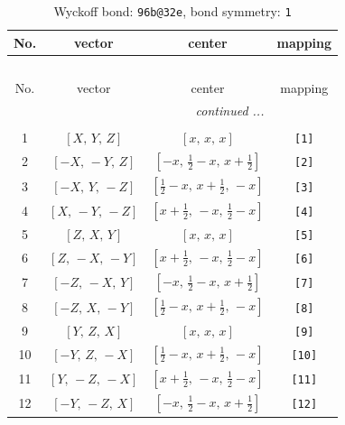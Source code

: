 \documentclass[fleqn,8pt]{jsarticle}
\begin{document}
\begin{longtable}{cccc}
\caption{Wyckoff bond: {\tt 96b@32e}, bond symmetry: {\tt 1}}
 \\
 \hline \hline
No. & vector & center & mapping \\ \hline \endfirsthead

\multicolumn{3}{l}{\tablename\ \thetable{}} \\
 \hline \hline
No. & vector & center & mapping \\ \hline \endhead

 \hline \hline
\multicolumn{3}{r}{\footnotesize\it continued ...} \\ \endfoot

 \hline \hline
\multicolumn{3}{r}{} \\ \endlastfoot

1 & $\left[ X,\, Y,\, Z \right]$ & $\left[ x,\, x,\, x \right]$ & {\tt [1]} \\ \hline
2 & $\left[ - X,\, - Y,\, Z \right]$ & $\left[ - x,\, \frac{1}{2} - x,\, x + \frac{1}{2} \right]$ & {\tt [2]} \\ \hline
3 & $\left[ - X,\, Y,\, - Z \right]$ & $\left[ \frac{1}{2} - x,\, x + \frac{1}{2},\, - x \right]$ & {\tt [3]} \\ \hline
4 & $\left[ X,\, - Y,\, - Z \right]$ & $\left[ x + \frac{1}{2},\, - x,\, \frac{1}{2} - x \right]$ & {\tt [4]} \\ \hline
5 & $\left[ Z,\, X,\, Y \right]$ & $\left[ x,\, x,\, x \right]$ & {\tt [5]} \\ \hline
6 & $\left[ Z,\, - X,\, - Y \right]$ & $\left[ x + \frac{1}{2},\, - x,\, \frac{1}{2} - x \right]$ & {\tt [6]} \\ \hline
7 & $\left[ - Z,\, - X,\, Y \right]$ & $\left[ - x,\, \frac{1}{2} - x,\, x + \frac{1}{2} \right]$ & {\tt [7]} \\ \hline
8 & $\left[ - Z,\, X,\, - Y \right]$ & $\left[ \frac{1}{2} - x,\, x + \frac{1}{2},\, - x \right]$ & {\tt [8]} \\ \hline
9 & $\left[ Y,\, Z,\, X \right]$ & $\left[ x,\, x,\, x \right]$ & {\tt [9]} \\ \hline
10 & $\left[ - Y,\, Z,\, - X \right]$ & $\left[ \frac{1}{2} - x,\, x + \frac{1}{2},\, - x \right]$ & {\tt [10]} \\ \hline
11 & $\left[ Y,\, - Z,\, - X \right]$ & $\left[ x + \frac{1}{2},\, - x,\, \frac{1}{2} - x \right]$ & {\tt [11]} \\ \hline
12 & $\left[ - Y,\, - Z,\, X \right]$ & $\left[ - x,\, \frac{1}{2} - x,\, x + \frac{1}{2} \right]$ & {\tt [12]} \\ \hline

\end{longtable}
\end{document}
